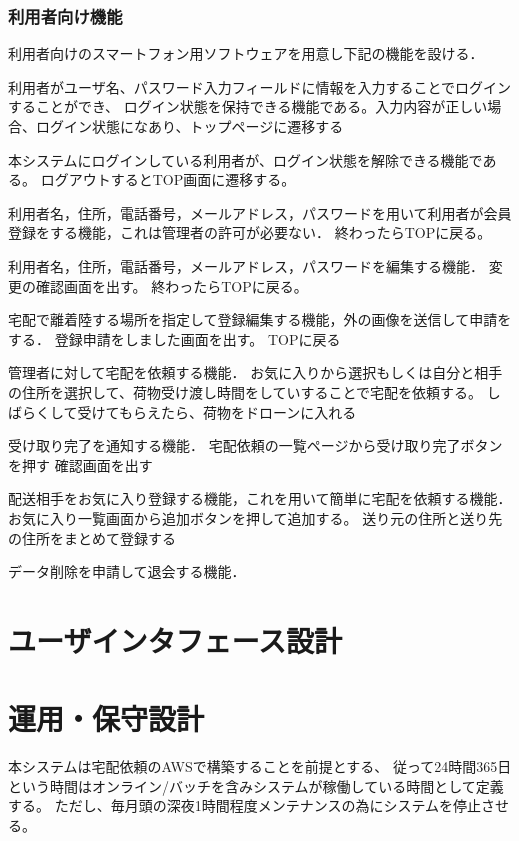 \documentclass[a4paper, titlepage]{jsarticle}
\begin{document}
\subsubsection{利用者向け機能}
利用者向けのスマートフォン用ソフトウェアを用意し下記の機能を設ける．
\begin{description}[labelwidth=\linewidth]
  \setlength{\leftskip}{1em}
  \item [ログイン機能] 利用者がユーザ名、パスワード入力フィールドに情報を入力することでログインすることができ、
  ログイン状態を保持できる機能である。入力内容が正しい場合、ログイン状態になあり、トップページに遷移する
  \item [ログアウト機能] 本システムにログインしている利用者が、ログイン状態を解除できる機能である。
  ログアウトするとTOP画面に遷移する。
  \item [利用者会員登録機能] 利用者名，住所，電話番号，メールアドレス，パスワードを用いて利用者が会員登録をする機能，これは管理者の許可が必要ない．
  終わったらTOPに戻る。
  \item [利用者会員情報編集機能] 利用者名，住所，電話番号，メールアドレス，パスワードを編集する機能．
  変更の確認画面を出す。
  終わったらTOPに戻る。
  \item [宅配場所登録機能] 宅配で離着陸する場所を指定して登録編集する機能，外の画像を送信して申請をする．
  登録申請をしました画面を出す。
  TOPに戻る
  \item [宅配依頼機能] 管理者に対して宅配を依頼する機能．
  お気に入りから選択もしくは自分と相手の住所を選択して、荷物受け渡し時間をしていすることで宅配を依頼する。
  しばらくして受けてもらえたら、荷物をドローンに入れる
  \item [受け取り完了通知機能] 受け取り完了を通知する機能．
  宅配依頼の一覧ページから受け取り完了ボタンを押す
  確認画面を出す
  \item [お気に入り登録機能] 配送相手をお気に入り登録する機能，これを用いて簡単に宅配を依頼する機能．
  お気に入り一覧画面から追加ボタンを押して追加する。
  送り元の住所と送り先の住所をまとめて登録する
  \item [退会機能] データ削除を申請して退会する機能．
\end{description}

\section{ユーザインタフェース設計}

\section{運用・保守設計}
本システムは宅配依頼のAWSで構築することを前提とする、
従って24時間365日という時間はオンライン/バッチを含みシステムが稼働している時間として定義する。
ただし、毎月頭の深夜1時間程度メンテナンスの為にシステムを停止させる。
\end{document}
